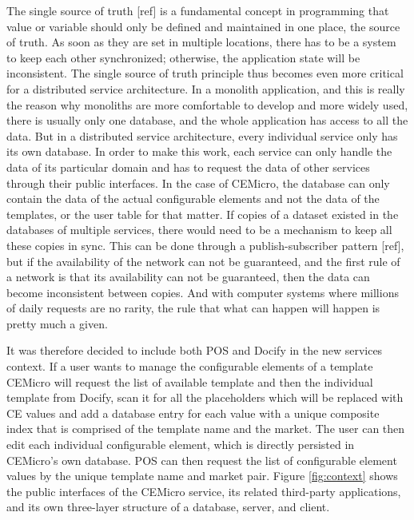 The single source of truth [ref] is a fundamental concept in programming that value or variable should only be defined and maintained in one place, the source of truth. As soon as they are set in multiple locations, there has to be a system to keep each other synchronized; otherwise, the application state will be inconsistent. The single source of truth principle thus becomes even more critical for a distributed service architecture. In a monolith application, and this is really the reason why monoliths are more comfortable to develop and more widely used, there is usually only one database, and the whole application has access to all the data. But in a distributed service architecture, every individual service only has its own database. In order to make this work, each service can only handle the data of its particular domain and has to request the data of other services through their public interfaces. In the case of CEMicro, the database can only contain the data of the actual configurable elements and not the data of the templates, or the user table for that matter. If copies of a dataset existed in the databases of multiple services, there would need to be a mechanism to keep all these copies in sync. This can be done through a publish-subscriber pattern [ref], but if the availability of the network can not be guaranteed, and the first rule of a network is that its availability can not be guaranteed, then the data can become inconsistent between copies. And with computer systems where millions of daily requests are no rarity, the rule that what can happen will happen is pretty much a given.

It was therefore decided to include both POS and Docify in the new services context. If a user wants to manage the configurable elements of a template CEMicro will request the list of available template and then the individual template from Docify, scan it for all the placeholders which will be replaced with CE values and add a database entry for each value with a unique composite index that is comprised of the template name and the market. The user can then edit each individual configurable element, which is directly persisted in CEMicro's own database. POS can then request the list of configurable element values by the unique template name and market pair. Figure \ref{fig:context} shows the public interfaces of the CEMicro service, its related third-party applications, and its own three-layer structure of a database, server, and client.

